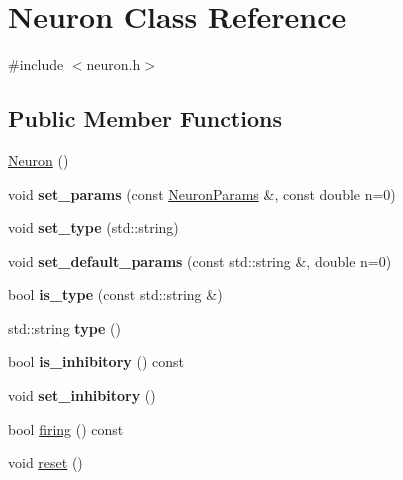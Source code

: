 \hypertarget{classNeuron}{}\section{Neuron Class Reference}
\label{classNeuron}


{\ttfamily \#include $<$neuron.\+h$>$}

\subsection*{Public Member Functions}
\begin{DoxyCompactItemize}
\item 
\hyperlink{classNeuron_a823487d01615fadb8ac19a2768dd9d96}{Neuron} ()
\item 
\mbox{\label{classNeuron_a85049e5f8745c53867178dd1cf6e51e3}} 
void {\bfseries set\+\_\+params} (const \hyperlink{structNeuronParams}{Neuron\+Params} \&, const double n=0)
\item 
\mbox{\label{classNeuron_a533359bca915ef99c96e50d4bfff58b2}} 
void {\bfseries set\+\_\+type} (std\+::string)
\item 
\mbox{\label{classNeuron_a0759d03a357708ee4174f1bbb2b0b8d7}} 
void {\bfseries set\+\_\+default\+\_\+params} (const std\+::string \&, double n=0)
\item 
\mbox{\label{classNeuron_a37459ba1dc4b0060707c33bf2ad5b10d}} 
bool {\bfseries is\+\_\+type} (const std\+::string \&)
\item 
\mbox{\label{classNeuron_abcf0b4ecd00cba630bfd2e764a61b5ee}} 
std\+::string {\bfseries type} ()
\item 
\mbox{\label{classNeuron_a649c6080b0749e6e642bf9df8f191d2d}} 
bool {\bfseries is\+\_\+inhibitory} () const
\item 
\mbox{\label{classNeuron_aa1481c474df55ad14373e51c6bb0f6fd}} 
void {\bfseries set\+\_\+inhibitory} ()
\item 
bool \hyperlink{classNeuron_a4f477ebb623a7681c0f09dbfc4608a0d}{firing} () const
\item 
void \hyperlink{classNeuron_a6817fc5bf2128150b41b65e74f018408}{reset} ()

\end{DoxyCompactItemize}
